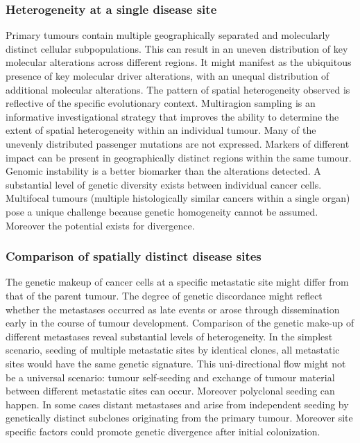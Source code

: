 		\subsubsection{Heterogeneity at a single disease site}
		Primary tumours contain multiple geographically separated and molecularly distinct cellular subpopulations.
		This can result in an uneven distribution of key molecular alterations across different regions.
		It might manifest as the ubiquitous presence of key molecular driver alterations, with an unequal distribution of additional molecular alterations.
		The pattern of spatial heterogeneity observed is reflective of the specific evolutionary context.
		Multiragion sampling is an informative investigational strategy that improves the ability to determine the extent of spatial heterogeneity within an individual tumour.
		Many of the unevenly distributed passenger mutations are not expressed.
		Markers of different impact can be present in geographically distinct regions within the same tumour.
		Genomic instability is a better biomarker than the alterations detected.
		A substantial level of genetic diversity exists between individual cancer cells.
		Multifocal tumours (multiple histologically similar cancers within a single organ) pose a unique challenge because genetic homogeneity cannot be assumed.
		Moreover the potential exists for divergence.

		\subsubsection{Comparison of spatially distinct disease sites}
		The genetic makeup of cancer cells at a specific metastatic site might differ from that of the parent tumour.
		The degree of genetic discordance might reflect whether the metastases occurred as late events or arose through dissemination early in the course of tumour development.
		Comparison of the genetic make-up of different metastases reveal substantial levels of heterogeneity.
		In the simplest scenario, seeding of multiple metastatic sites by identical clones, all metastatic sites would have the same genetic signature.
		This uni-directional flow might not be a universal scenario: tumour self-seeding and exchange of tumour material between different metastatic sites can occur.
		Moreover polyclonal seeding can happen.
		In some cases distant metastases and arise from independent seeding by genetically distinct subclones originating from the primary tumour.
		Moreover site specific factors could promote genetic divergence after initial colonization.

